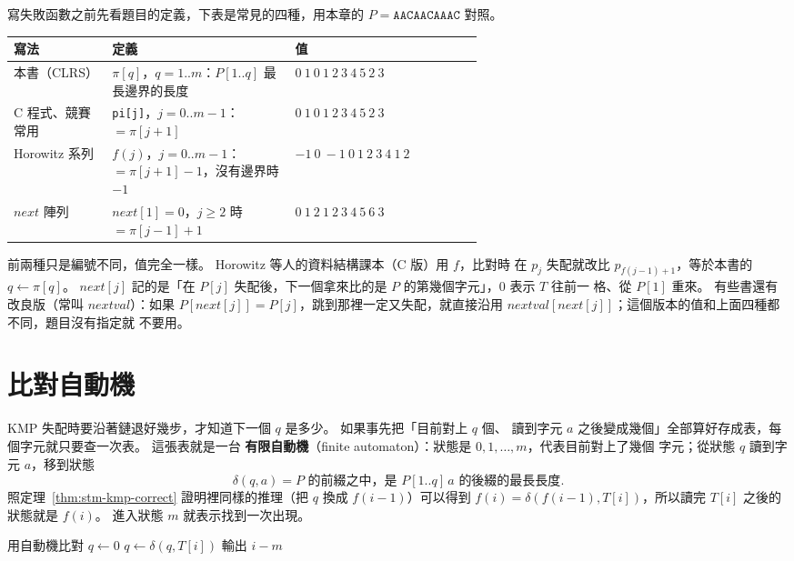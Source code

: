 \begin{examnote}
寫失敗函數之前先看題目的定義，下表是常見的四種，用本章的 $P = \mathtt{AACAACAAAC}$
對照。
\begin{center}
\small
\begin{tabular}{>{\raggedright\arraybackslash}p{0.21\linewidth}>{\raggedright\arraybackslash}p{0.39\linewidth}l}
\toprule
寫法 & 定義 & 值 \\
\midrule
本書（CLRS） & $\pi[q]$，$q = 1..m$：$P[1..q]$ 最長邊界的長度 & $0\ 1\ 0\ 1\ 2\ 3\ 4\ 5\ 2\ 3$ \\
C 程式、競賽常用 & \texttt{pi[j]}，$j = 0..m-1$：$= \pi[j + 1]$ & $0\ 1\ 0\ 1\ 2\ 3\ 4\ 5\ 2\ 3$ \\
Horowitz 系列 & $f(j)$，$j = 0..m-1$：$= \pi[j + 1] - 1$，沒有邊界時 $-1$ & $-1\ 0\ -1\ 0\ 1\ 2\ 3\ 4\ 1\ 2$ \\
$\mathit{next}$ 陣列 & $\mathit{next}[1] = 0$，$j \ge 2$ 時 $= \pi[j - 1] + 1$ & $0\ 1\ 2\ 1\ 2\ 3\ 4\ 5\ 6\ 3$ \\
\bottomrule
\end{tabular}
\end{center}
前兩種只是編號不同，值完全一樣。 Horowitz 等人的資料結構課本（C 版）用 $f$，比對時
在 $p_j$ 失配就改比 $p_{f(j-1)+1}$，等於本書的 $q \gets \pi[q]$。 $\mathit{next}[j]$
記的是「在 $P[j]$ 失配後，下一個拿來比的是 $P$ 的第幾個字元」，$0$ 表示 $T$ 往前一
格、從 $P[1]$ 重來。 有些書還有改良版（常叫 $\mathit{nextval}$）：如果
$P[\mathit{next}[j]] = P[j]$，跳到那裡一定又失配，就直接沿用
$\mathit{nextval}[\mathit{next}[j]]$；這個版本的值和上面四種都不同，題目沒有指定就
不要用。
\end{examnote}

\section{比對自動機}
\label{sec:stm-dfa}

KMP 失配時要沿著鏈退好幾步，才知道下一個 $q$ 是多少。 如果事先把「目前對上 $q$ 個、
讀到字元 $a$ 之後變成幾個」全部算好存成表，每個字元就只要查一次表。 這張表就是一台
\textbf{有限自動機}（finite automaton）：狀態是 $0, 1, \ldots, m$，代表目前對上了幾個
字元；從狀態 $q$ 讀到字元 $a$，移到狀態
\[
\delta(q, a) = \text{$P$ 的前綴之中，是 $P[1..q]\,a$ 的後綴的最長長度}.
\]
照定理~\ref{thm:stm-kmp-correct} 證明裡同樣的推理（把 $q$ 換成 $f(i - 1)$）可以得到
$f(i) = \delta(f(i - 1), T[i])$，所以讀完 $T[i]$ 之後的狀態就是 $f(i)$。 進入狀態 $m$ 就表示找到一次出現。

\begin{pseudo}[label=alg:stm-dfa-match]{用自動機比對}
    \State $q \gets 0$
        \State $q \gets \delta(q, T[i])$
            \State 輸出 $i - m$
        \EndIf
    \EndFor
\EndProcedure
\end{pseudo}

